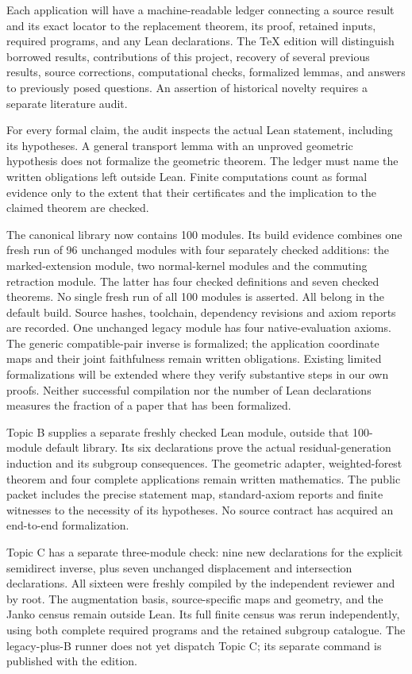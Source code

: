 \documentclass[11pt,a4paper]{article}
\begin{document}
Each application will have a machine-readable ledger connecting a source
result and its exact locator to the replacement theorem, its proof,
retained inputs, required programs, and any Lean declarations. The TeX
edition will distinguish borrowed results, contributions of this project,
recovery of several previous results, source corrections, computational
checks, formalized lemmas, and answers to previously posed questions.
An assertion of historical novelty requires a separate literature audit.

For every formal claim, the audit inspects the actual Lean statement,
including its hypotheses. A general transport lemma with an unproved
geometric hypothesis does not formalize the geometric theorem. The
ledger must name the written obligations left outside Lean. Finite
computations count as formal evidence only to the extent that their
certificates and the implication to the claimed theorem are checked.

The canonical library now contains 100 modules. Its build evidence combines
one fresh run of 96 unchanged modules with four separately checked additions:
the marked-extension module, two normal-kernel modules and the commuting
retraction module. The latter has four checked definitions and seven checked
theorems. No single fresh run of all 100 modules is asserted. All belong in
the default build. Source hashes, toolchain, dependency revisions and axiom
reports are recorded. One unchanged legacy module has four native-evaluation
axioms. The generic compatible-pair inverse is formalized; the application
coordinate maps and their joint faithfulness remain written obligations.
Existing limited formalizations will be extended where they verify
substantive steps in our own proofs. Neither successful compilation
nor the number of Lean declarations measures the fraction of a paper
that has been formalized.

Topic B supplies a separate freshly checked Lean module, outside that
100-module default library. Its six declarations prove the actual
residual-generation induction and its subgroup consequences. The geometric
adapter, weighted-forest theorem and four complete applications remain
written mathematics. The public packet includes the precise statement map,
standard-axiom reports and finite witnesses to the necessity of its
hypotheses. No source contract has acquired an end-to-end formalization.

Topic C has a separate three-module check: nine new declarations for the
explicit semidirect inverse, plus seven unchanged displacement and
intersection declarations. All sixteen were freshly compiled by the
independent reviewer and by root. The augmentation basis, source-specific
maps and geometry, and the Janko census remain outside Lean. Its full
finite census was rerun independently, using both complete required
programs and the retained subgroup catalogue. The legacy-plus-B runner
does not yet dispatch Topic C; its separate command is published with
the edition.
\end{document}
